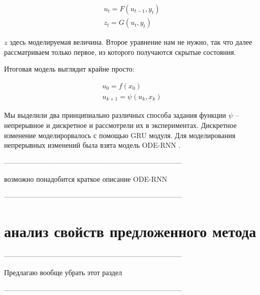 \documentclass[12pt, twoside]{article}
\begin{document}
\begin{equation}
	\begin{split}
		u_t = F(u_{t-1}, y_t) \\ 
		z_{t} = G(u_t, y_t)
	\end{split}
\end{equation}

$z$ здесь моделируемая величина. Второе уравнение нам не нужно, так что далее рассматриваем только первое, из которого получаются скрытые состояния.

Итоговая модель выглядит крайне просто:

\begin{equation}
	\begin{split}
		u_0 = f(x_0) \\ 
		u_{k + 1} = \psi(u_k, x_k)
	\end{split}
\end{equation}

Мы выделили два принципиально различных способа задания функции $\psi$ -- непрерывное и дискретное и рассмотрели их в экспериментах. Дискретное изменение моделирорвалось с помощью GRU модуля. Для моделирования непрерывных изменений была взята модель ODE-RNN \cite{rubanova2019latent}.



---------------------------------------------------------------------------

возможно понадобится краткое описание ODE-RNN

---------------------------------------------------------------------------

\section{анализ свойств предложенного метода}
\label{sec:theor_background}
---------------------------------------------------------------------------

Предлагаю вообще убрать этот раздел

---------------------------------------------------------------------------
\end{document}
